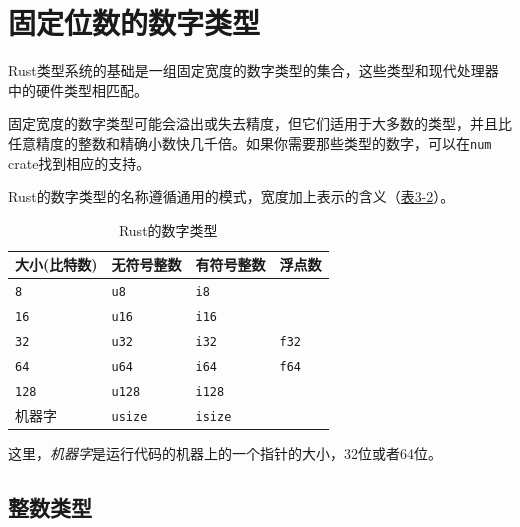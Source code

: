 \section{固定位数的数字类型}
Rust类型系统的基础是一组固定宽度的数字类型的集合，这些类型和现代处理器中的硬件类型相匹配。

固定宽度的数字类型可能会溢出或失去精度，但它们适用于大多数的类型，并且比任意精度的整数和精确小数快几千倍。如果你需要那些类型的数字，可以在\texttt{num} crate找到相应的支持。

Rust的数字类型的名称遵循通用的模式，宽度加上表示的含义（\hyperref[t3-2]{表3-2}）。
\begin{table}[htbp]
    \centering
    \caption{Rust的数字类型}
    \label{t3-2}
    \begin{tabular}{llll}
        \hline
        \textbf{大小(比特数)}   & \textbf{无符号整数}   & \textbf{有符号整数}   & \textbf{浮点数}   \\
        \hline
        \texttt{8}  & \texttt{u8}   & \texttt{i8}   &              \\
        \rowcolor{tablecolor} 
        \texttt{16} & \texttt{u16}  & \texttt{i16}  &              \\
        \texttt{32} & \texttt{u32}  & \texttt{i32}  & \texttt{f32} \\
        \rowcolor{tablecolor} 
        \texttt{64} & \texttt{u64}  & \texttt{i64}  & \texttt{f64} \\
        \texttt{128}& \texttt{u128} & \texttt{i128} &              \\
        \rowcolor{tablecolor} 
        机器字      & \texttt{usize} & \texttt{isize} & \\
    \end{tabular}
\end{table}

这里，\emph{机器字}是运行代码的机器上的一个指针的大小，32位或者64位。

\subsection{整数类型}

